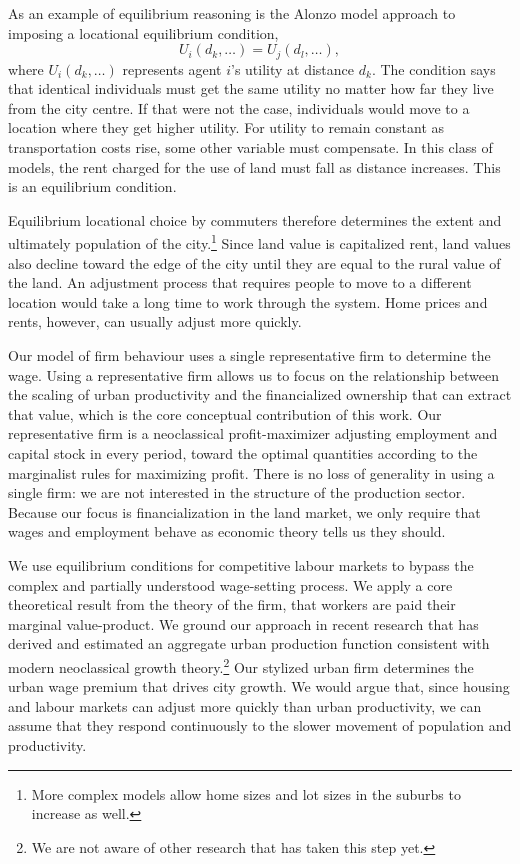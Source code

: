 As an example of \gls{equilibrium reasoning} is the \Gls{Alonzo model} approach to imposing a locational equilibrium condition,
\[U_i(d_k,\dots)=U_j(d_l, \dots),\] where $U_i(d_k,\dots)$ represents agent $i$'s utility at distance $d_k$. 
The condition says that identical individuals must get the same utility no matter how far they live from the city centre. If that were not the case, individuals would move to a location where they get higher utility. For utility to remain constant as transportation costs rise, some other variable must compensate. In this class of models, the rent charged for the use of land must fall as distance increases.
This is an equilibrium condition. 

Equilibrium locational choice by commuters therefore determines the extent and ultimately population of the city.\footnote{More complex models allow home sizes and lot sizes in the suburbs to increase as well.} Since land value is \gls{capitalize}d rent, land values also decline toward the edge of the city until they are equal to the rural value of the land. 
An adjustment process that requires people to move to a different location would take a long time to work through the system. Home prices and rents, however, can usually adjust more quickly. 

Our model of firm behaviour uses a single representative firm to determine the wage. Using a representative firm allows us to focus on the relationship between the scaling of urban productivity and the financialized ownership that can extract that value, which is the core conceptual contribution of this work. Our representative firm is a neoclassical profit-maximizer adjusting employment and capital stock in every period, toward the optimal quantities according to the marginalist rules for maximizing profit. There is no loss of generality in using a single firm: we are not interested in the structure of the production sector. Because our focus is financialization in the land market, we only require that wages and employment behave as economic theory tells us they should. 

 We use equilibrium conditions for competitive labour markets to bypass the complex and partially understood wage-setting process. We apply a core theoretical result from the theory of the firm, that workers are paid their \gls{marginal value-product}. We ground our approach in recent research that has derived and estimated an aggregate urban production function consistent with modern \gls{neoclassical growth theory}.\footnote{We are not aware of other research that has taken this step yet.} Our stylized urban firm determines the urban wage premium that drives city growth. We would argue that, since housing and labour markets can adjust more quickly than urban productivity, we can assume that they respond continuously to the slower movement of population and productivity. %



